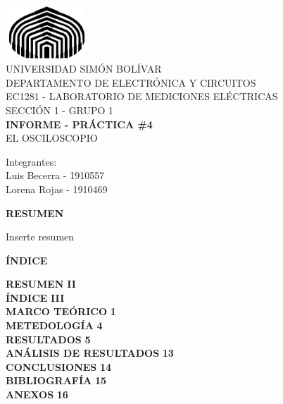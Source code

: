 \documentclass[12pt]{article}
\begin{document}
	
	\thispagestyle{empty}
	
	\begin{center}
		\includegraphics[width=3.1cm,height=2cm]{logo}\\
		UNIVERSIDAD SIMÓN BOLÍVAR\\
		DEPARTAMENTO DE ELECTRÓNICA Y CIRCUITOS\\
		EC1281 - LABORATORIO DE MEDICIONES ELÉCTRICAS\\
		SECCIÓN 1 - GRUPO 1\\
		
		\vspace{7cm}
		\textbf{\Large INFORME - PRÁCTICA \#4}\\
		EL OSCILOSCOPIO\\
	\end{center}
	
	\begin{flushleft}
		\vspace{9cm}
		\hfill Integrantes:\\
		\hfill {\large Luis Becerra - 1910557}\\
		\hfill {\large Lorena Rojas - 1910469}\\
	\end{flushleft}
	
	\newpage
	
        \setcounter{page}{2}
	
	\begin{center}
		\textbf{\large RESUMEN}\\
	\end{center}
	
	Inserte resumen
	
	\newpage
	
	\begin{center}
		\textbf{\large ÍNDICE}\\
	\end{center}
	
	\noindent \textbf{RESUMEN} \hfill \textbf{II}\\
	\noindent \textbf{ÍNDICE} \hfill \textbf{III}\\
	\noindent \textbf{MARCO TEÓRICO} \hfill \textbf{1}\\
	\noindent \textbf{METEDOLOGÍA} \hfill \textbf{4}\\
	\noindent \textbf{RESULTADOS} \hfill \textbf{5}\\
	\noindent \textbf{ANÁLISIS DE RESULTADOS} \hfill \textbf{13}\\
	\noindent \textbf{CONCLUSIONES} \hfill \textbf{14}\\
	\noindent \textbf{BIBLIOGRAFÍA} \hfill \textbf{15}\\
	\noindent \textbf{ANEXOS} \hfill \textbf{16}\\
	
\end{document}
